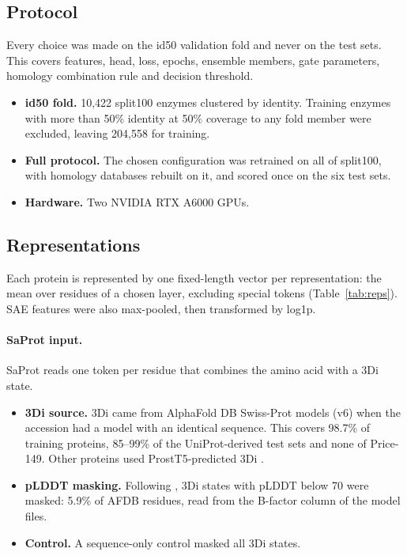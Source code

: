 \documentclass[11pt]{article}
\begin{document}
\subsection{Protocol}
Every choice was made on the id50 validation fold and never on the test sets. This covers features, head, loss,
epochs, ensemble members, gate parameters, homology combination rule and decision threshold.
\begin{itemize}
  \item \textbf{id50 fold.} 10,422 split100 enzymes clustered by identity. Training enzymes with more than 50\% identity
        at 50\% coverage to any fold member were excluded, leaving 204,558 for training.
  \item \textbf{Full protocol.} The chosen configuration was retrained on all of split100, with homology databases
        rebuilt on it, and scored once on the six test sets.
  \item \textbf{Hardware.} Two NVIDIA RTX A6000 GPUs.
\end{itemize}

\subsection{Representations}
Each protein is represented by one fixed-length vector per representation: the mean over residues of a chosen layer,
excluding special tokens (Table~\ref{tab:reps}). SAE features were also max-pooled, then transformed by log1p.

\paragraph{SaProt input.} SaProt reads one token per residue that combines the amino acid with a 3Di state.
\begin{itemize}
  \item \textbf{3Di source.} 3Di came from AlphaFold DB Swiss-Prot models (v6) \cite{afdb2022} when the accession had a
        model with an identical sequence. This covers 98.7\% of training proteins, 85--99\% of the UniProt-derived test
        sets and none of Price-149. Other proteins used ProstT5-predicted 3Di \cite{prostt5}.
  \item \textbf{pLDDT masking.} Following \cite{saprot}, 3Di states with pLDDT below 70 were masked: 5.9\% of AFDB
        residues, read from the B-factor column of the model files.
  \item \textbf{Control.} A sequence-only control masked all 3Di states.
\end{itemize}
\end{document}
